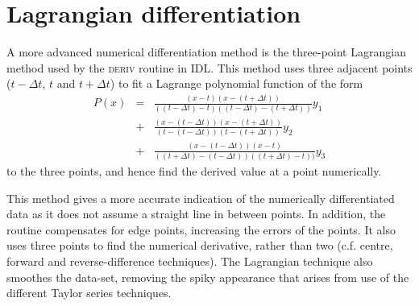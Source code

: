 \section{Lagrangian differentiation}
\label{sect:lagrange}


A more advanced numerical differentiation method is the three-point Lagrangian method used by the \textsc{deriv} routine in IDL. This method uses three adjacent points ($t-\Delta t$, $t$ and $t+\Delta t$) to fit a Lagrange polynomial function of the form
\begin{eqnarray}
P(x) &=& \frac{(x - t)(x - (t+\Delta t))}{((t-\Delta t) - t)((t-\Delta t)- (t+\Delta t))}y_{1} \nonumber \\
&+& \frac{(x - (t-\Delta t))(x - (t+\Delta t))}{(t - (t-\Delta t))(t - (t+\Delta t))}y_{2} \nonumber \\ 
&+& \frac{(x - (t-\Delta t))(x - t)}{((t+\Delta t) - (t-\Delta t))((t+\Delta t) - t))}y_{3}
\end{eqnarray}
to the three points, and hence find the derived value at a point numerically.

This method gives a more accurate indication of the numerically differentiated data as it does not assume a straight line in between points. In addition, the routine compensates for edge points, increasing the errors of the points. It also uses three points to find the numerical derivative, rather than two (c.f. centre, forward and reverse-difference techniques). The Lagrangian technique also smoothes the data-set, removing the spiky appearance that arises from use of the different Taylor series techniques.

